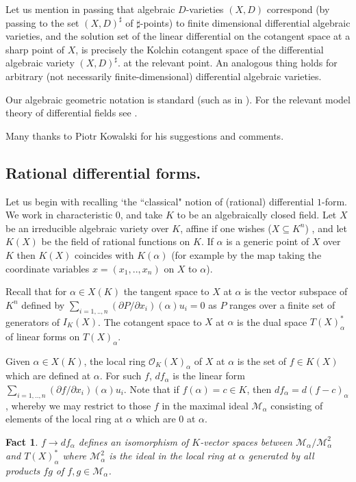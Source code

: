 \documentclass[12pt]{article}
\newtheorem{Fact}[Theorem]{Fact}
\begin{document}
Let us mention in passing that algebraic $D$-varieties $(X,D)$ correspond (by passing to the set  $(X,D)^{\sharp}$ of $\sharp$-points) to finite dimensional differential algebraic varieties, and the solution set of the linear differential on the cotangent space at a sharp point of $X$, is precisely the Kolchin cotangent space of the differential algebraic variety $(X,D)^{\sharp}$. at the relevant point.  An analogous thing holds for arbitrary (not necessarily finite-dimensional) differential algebraic varieties. 


Our algebraic geometric notation is standard (such as in \cite{Shafarevich}).  For the relevant model theory of differential fields see \cite{Pillay-Ziegler}. 

Many thanks to Piotr Kowalski for his suggestions and comments. 

\subsection{Rational differential forms.}
Let us begin with recalling `the ``classical" notion of (rational) differential $1$-form.
We work in characteristic $0$, and take $K$ to be an algebraically closed field. Let $X$ be an irreducible algebraic variety over $K$, affine if one wishes ($X\subseteq K^{n}$) , and let $K(X)$ be the field of rational functions on $K$.
If $\alpha$ is a generic point of $X$ over $K$ then $K(X)$  coincides  with $K(\alpha)$   (for example by the map taking the coordinate variables $x = (x_{1},..,x_{n})$ on $X$ to $\alpha$).

Recall that for $\alpha\in X(K)$ the tangent space to $X$ at $\alpha$ is the vector subspace of $K^{n}$ defined by $\sum_{i=1,..,n} (\partial P/\partial x_{i})(\alpha) u_{i} = 0$ as $P$ ranges over a finite set of generators of $I_{K}(X)$. 
The cotangent space to $X$ at $\alpha$ is the dual space $T(X)_{\alpha}^{*}$ of linear forms on $T(X)_{\alpha}$.

Given $\alpha\in X(K)$, the local ring ${\mathcal O}_{K}(X)_{\alpha}$ of $X$ at $\alpha$ is the set of $f\in K(X)$ which are defined at $\alpha$. For such $f $, $df_{\alpha}$ is the linear form 
$\sum_{i=1,..,n}(\partial f/\partial x_{i})(\alpha)u_{i}$.  Note that if $f(\alpha) = c\in K$, then $df_{\alpha} = d(f-c)_{\alpha}$, whereby we may restrict to those $f$ in  the maximal ideal $ {\mathcal M}_{\alpha}$ consisting of  elements of the local ring at $\alpha$ which are $0$ at $\alpha$.

\begin{Fact} $f\to df_{\alpha}$ defines an isomorphism of $K$-vector spaces between ${\mathcal M}_{\alpha} /{\mathcal M}_{\alpha}^{2}$ and $T(X)_{\alpha}^{*}$ where ${\mathcal M}_{\alpha}^{2}$ is the ideal in the local ring at $\alpha$ generated by all products $fg$ of $f,g\in {\mathcal M}_{\alpha}$.
\end{Fact} 
\end{document}
